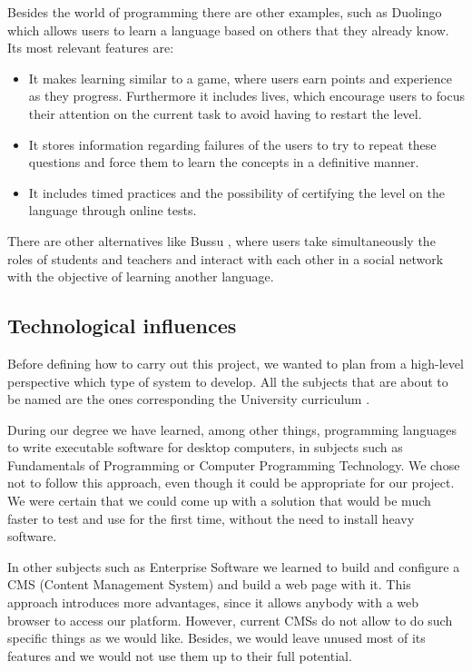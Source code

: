 Besides the world of programming there are other examples, such as Duolingo \cite{duolingo} which allows users to learn a language based on others that they already know. Its most relevant features are:

\begin{itemize}
\item
It makes learning similar to a game, where users earn points and experience as they progress. Furthermore it includes lives, which encourage users to focus their attention on the current task to avoid having to restart the level.

\item
It stores information regarding failures of the users to try to repeat these questions and force them to learn the concepts in a definitive manner.

\item
It includes timed practices and the possibility of certifying the level on the language through online tests.
\end{itemize}

There are other alternatives like Bussu \cite{bussu}, where users take simultaneously the roles of students and teachers and interact with each other in a social network with the objective of learning another language.

\subsection{Technological influences\label{subsec:influences}}
Before defining how to carry out this project, we wanted to plan from a high-level perspective which type of system to develop. All the subjects that are about to be named are the ones corresponding the University curriculum \cite{plan, boe}. 

During our degree we have learned, among other things, programming languages to write executable software for desktop computers, in subjects such as Fundamentals of Programming or Computer Programming Technology. We chose not to follow this approach, even though it could be appropriate for our project. We were certain that we could come up with a solution that would be much faster to test and use for the first time, without the need to install heavy software.

In other subjects such as Enterprise Software we learned to build and configure a CMS (Content Management System) and build a web page with it. This approach introduces more advantages, since it allows anybody with a web browser to access our platform. However, current CMSs do not allow to do such specific things as we would like. Besides, we would leave unused most of its features and we would not use them up to their full potential.

